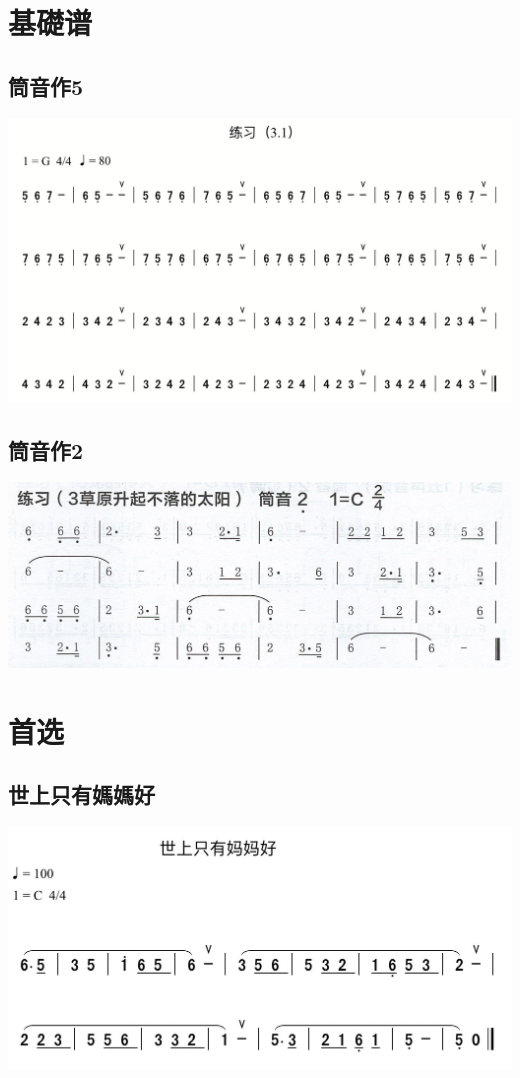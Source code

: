 \documentclass[cn,pad,twocol]{elegantbook}
\begin{document}
\chapter{基礎谱}
\section{筒音作5}
\begin{center}
	\includegraphics[width=\textwidth]{dongxiao/20200419-练习3.1.png}
\end{center}
\section{筒音作2}
	\includegraphics[width=\textwidth]{dongxiao/Scan 6.jpeg}

\chapter{首选}
\section{世上只有媽媽好}
	\includegraphics[width=\textwidth]{dongxiao/IMG_0854-世上只有妈妈好.png}
\end{document}
